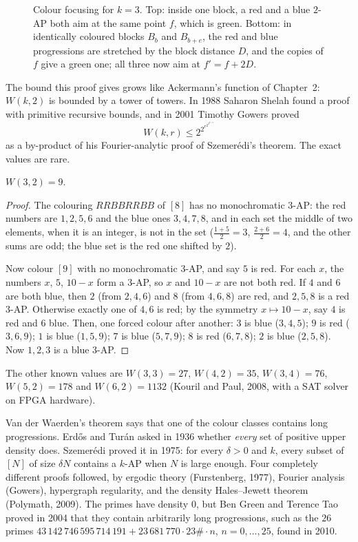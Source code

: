 \begin{figure}[ht]
\centering
{}
\caption{Colour focusing for $k=3$. Top: inside one block, a red and a blue $2$-AP both aim at the same point $f$, which is green. Bottom: in identically
coloured blocks $B_b$ and $B_{b+e}$, the red and blue progressions are stretched by the block distance $D$, and the copies of $f$ give a green one; all three now aim
at $f'=f+2D$.}
\label{fig:focusing}
\end{figure}

The bound this proof gives grows like Ackermann's function of Chapter~2: $W(k,2)$ is bounded by a tower of towers. In 1988 Saharon Shelah found a proof with
primitive recursive bounds, and in 2001 Timothy Gowers proved
\[
W(k,r)\le2^{2^{r^{2^{2^{k+9}}}}}
\]
as a by-product of his Fourier-analytic proof of Szemer\'edi's theorem. The exact values are rare.

\begin{proposition}\label{prop:w32}
$W(3,2)=9$.
\end{proposition}
\begin{proof}
The colouring $RRBBRRBB$ of $[8]$ has no monochromatic $3$-AP: the red numbers are $1,2,5,6$ and the blue ones $3,4,7,8$, and in each set the middle of two elements, when
it is an integer, is not in the set ($\frac{1+5}2=3$, $\frac{2+6}2=4$, and the other sums are odd; the blue set is the red one shifted by $2$).

Now colour $[9]$ with no monochromatic $3$-AP, and say $5$ is red. For each $x$, the numbers $x$, $5$, $10-x$ form a $3$-AP, so $x$ and $10-x$ are not both red. If $4$ and $6$ are
both blue, then $2$ (from $2,4,6$) and $8$ (from $4,6,8$) are red, and $2,5,8$ is a red $3$-AP. Otherwise exactly one of $4,6$ is red; by the symmetry $x\mapsto10-x$, say $4$
is red and $6$ blue. Then, one forced colour after another: $3$ is blue ($3,4,5$); $9$ is red ($3,6,9$); $1$ is blue ($1,5,9$); $7$ is blue ($5,7,9$); $8$ is red ($6,7,8$);
$2$ is blue ($2,5,8$). Now $1,2,3$ is a blue $3$-AP.
\end{proof}

The other known values are $W(3,3)=27$, $W(4,2)=35$, $W(3,4)=76$, $W(5,2)=178$ and $W(6,2)=1132$ (Kouril and Paul, 2008, with a SAT solver on FPGA hardware).

\begin{remark}
Van der Waerden's theorem says that one of the colour classes contains long progressions. Erd\H os and Tur\'an asked in 1936 whether \emph{every} set of positive upper density
does. Szemer\'edi proved it in 1975: for every $\delta>0$ and $k$, every subset of $[N]$ of size $\delta N$ contains a $k$-AP when $N$ is large enough. Four completely different
proofs followed, by ergodic theory (Furstenberg, 1977), Fourier analysis (Gowers), hypergraph regularity, and the density Hales--Jewett theorem (Polymath, 2009). The primes
have density $0$, but Ben Green and Terence Tao proved in 2004 that they contain arbitrarily long progressions, such as the $26$ primes
$43\,142\,746\,595\,714\,191+23\,681\,770\cdot23\#\cdot n$, $n=0,\dots,25$, found in 2010.
\end{remark}

